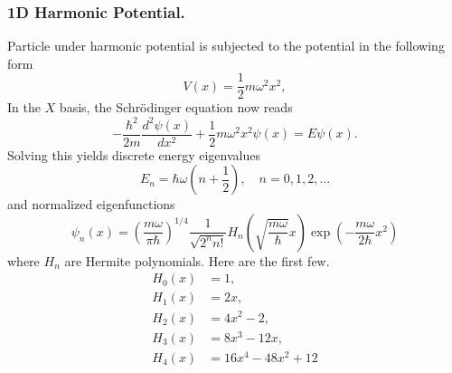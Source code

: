 \documentclass[../../../main.tex]{subfiles}
\begin{document}
\subsubsection{1D Harmonic Potential.}
Particle under harmonic potential is subjected to the potential in the following form
\begin{equation*}
  V(x) = \frac{1}{2} m \omega^{2} x^{2},
\end{equation*}
In the $X$ basis, the Schrödinger equation now reads
\begin{equation*}
  -\frac{\hbar^{2}}{2m} \frac{d^{2}\psi(x)}{dx^{2}} + \frac{1}{2}m\omega^{2}x^{2}\psi(x) = E\psi(x).
\end{equation*}
Solving this yields discrete energy eigenvalues
\begin{equation*}
  E_{n} = \hbar\omega \left(n + \frac{1}{2}\right), \quad n = 0, 1, 2, \ldots
\end{equation*}
and normalized eigenfunctions
\begin{equation*}
  \psi_{n}(x) = \left(\frac{m\omega}{\pi\hbar}\right)^{1/4} \frac{1}{\sqrt{2^{n} n!}} H_{n}\left(\sqrt{\frac{m\omega}{\hbar}} x\right) \exp \left( -\frac{m\omega }{2\hbar}x^{2} \right)
\end{equation*}
where \(H_{n}\) are Hermite polynomials.
Here are the first few.
\begin{align*}
  H_{0}(x) & = 1,                     \\
  H_{1}(x) & = 2x,                    \\
  H_{2}(x) & = 4x^{2} - 2,            \\
  H_{3}(x) & = 8x^{3} - 12x,          \\
  H_{4}(x) & = 16x^{4} - 48x^{2} + 12
\end{align*}
\end{document}
